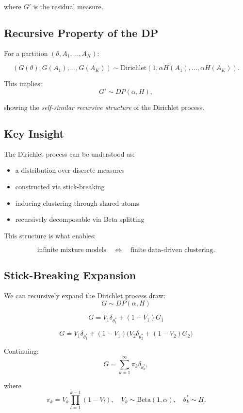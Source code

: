 \documentclass[12pt,oneside]{book}
\numberwithin{equation}{section}
\theoremstyle{definition}
\theoremstyle{plain}
\theoremstyle{remark}
\begin{document}
where $G'$ is the residual measure.

\subsection*{Recursive Property of the DP}

For a partition $(\theta, A_1,\dots,A_K)$:

\[
(G(\theta), G(A_1), \dots, G(A_K))
\sim
\mathrm{Dirichlet}(1, \alpha H(A_1), \dots, \alpha H(A_K)).
\]

This implies:
\[
G' \sim DP(\alpha, H),
\]

showing the \emph{self-similar recursive structure} of the Dirichlet process.

\subsection*{Key Insight}

The Dirichlet process can be understood as:

\begin{itemize}
\item a distribution over discrete measures
\item constructed via stick-breaking
\item inducing clustering through shared atoms
\item recursively decomposable via Beta splitting
\end{itemize}

This structure is what enables:

\[
\text{infinite mixture models} \quad \Longleftrightarrow \quad \text{finite data-driven clustering}.
\]

\subsection*{Stick-Breaking Expansion}

We can recursively expand the Dirichlet process draw:
\[
G \sim DP(\alpha, H)
\]

\[
G = V_1 \delta_{\theta_1^*} + (1 - V_1) G_1
\]

\[
G = V_1 \delta_{\theta_1^*} + (1 - V_1)\big(V_2 \delta_{\theta_2^*} + (1 - V_2) G_2\big)
\]

Continuing:
\[
G = \sum_{k=1}^{\infty} \pi_k \delta_{\theta_k^*},
\]

where
\[
\pi_k = V_k \prod_{l=1}^{k-1} (1 - V_l),
\quad
V_k \sim \mathrm{Beta}(1,\alpha),
\quad
\theta_k^* \sim H.
\]
\end{document}
